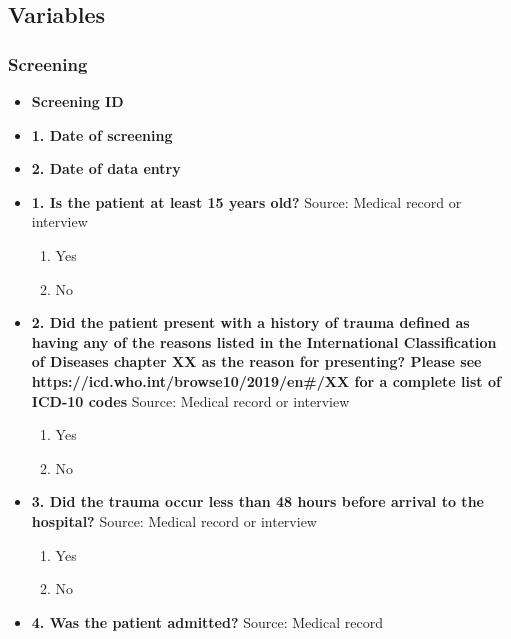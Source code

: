 \documentclass[
]{scrartcl}
\providecommand{\tightlist}{%
  \setlength{\itemsep}{0pt}\setlength{\parskip}{0pt}}\usepackage{longtable,booktabs,array}
\begin{document}
\hypertarget{sec-variables}{%
\subsection{Variables}\label{sec-variables}}

\hypertarget{screening-2}{%
\subsubsection{Screening}\label{screening-2}}

\begin{itemize}
\item
  \textbf{Screening ID}
\item
  \textbf{1. Date of screening}
\item
  \textbf{2. Date of data entry}
\item
  \textbf{1. Is the patient at least 15 years old?} Source: Medical
  record or interview

  \begin{enumerate}
  \def\labelenumi{\arabic{enumi}.}
  \tightlist
  \item
    Yes
  \item
    No
  \end{enumerate}
\item
  \textbf{2. Did the patient present with a history of trauma defined as
  having any of the reasons listed in the International Classification
  of Diseases chapter XX as the reason for presenting? Please see
  https://icd.who.int/browse10/2019/en\#/XX for a complete list of
  ICD-10 codes} Source: Medical record or interview

  \begin{enumerate}
  \def\labelenumi{\arabic{enumi}.}
  \tightlist
  \item
    Yes
  \item
    No
  \end{enumerate}
\item
  \textbf{3. Did the trauma occur less than 48 hours before arrival to
  the hospital?} Source: Medical record or interview

  \begin{enumerate}
  \def\labelenumi{\arabic{enumi}.}
  \tightlist
  \item
    Yes
  \item
    No
  \end{enumerate}
\item
  \textbf{4. Was the patient admitted?} Source: Medical record


\end{itemize}
\end{document}
